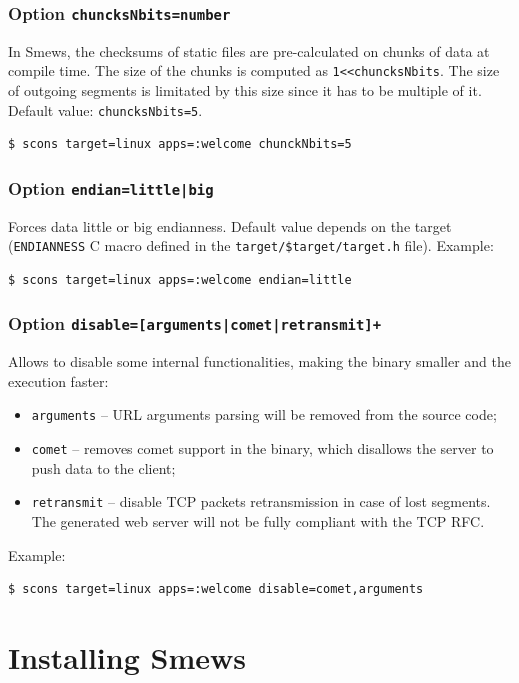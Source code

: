 \documentclass{report}
\begin{document}
\subsubsection{Option {\tt chuncksNbits=number}}

In Smews, the checksums of static files are pre-calculated on chunks of data at compile time. The size of the chunks is computed as \verb+1<<chuncksNbits+. The size of outgoing segments is limitated by this size since it has to be multiple of it. Default value: \verb+chuncksNbits=5+.
\begin{verbatim}
$ scons target=linux apps=:welcome chunckNbits=5
\end{verbatim}

\subsubsection{Option {\tt endian=little|big}}

Forces data little or big endianness. Default value depends on the target (\verb+ENDIANNESS+ C macro defined in the \verb+target/$target/target.h+ file). Example:
\begin{verbatim}
$ scons target=linux apps=:welcome endian=little
\end{verbatim}

\subsubsection{Option {\tt disable=[arguments|comet|retransmit]+}}

Allows to disable some internal functionalities, making the binary smaller and the execution faster:
\begin{itemize}
\item \texttt{arguments} -- URL arguments parsing will be removed from the source code;
\item \texttt{comet} -- removes comet support in the binary, which disallows the server to push data to the client;
\item \texttt{retransmit} -- disable TCP packets retransmission in case of lost segments. The generated web server will not be fully compliant with the TCP RFC.
\end{itemize}

Example:
\begin{verbatim}
$ scons target=linux apps=:welcome disable=comet,arguments
\end{verbatim}

\section{Installing Smews}
\label{sec:install}
\end{document}
